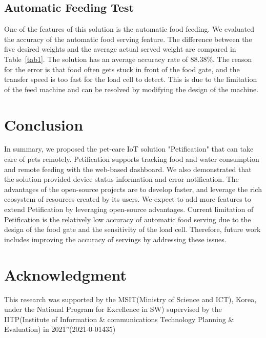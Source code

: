\documentclass[conference]{IEEEtran}
\begin{document}
\subsection{Automatic Feeding Test}
One of the features of this solution is the automatic food feeding. We evaluated the accuracy of the automatic food serving feature.
The difference between the five desired weights and the average actual served weight are compared in Table~\ref{tab1}. 
The solution has an average accuracy rate of 88.38\%.
The reason for the error is that food often gets stuck in front of the food gate, and the transfer speed is too fast for the load cell to detect.
This is due to the limitation of the feed machine and can be resolved by modifying the design of the machine.


\balance 
\section{Conclusion}
In summary, we proposed the pet-care IoT solution "Petification" that can take care of pets remotely. 
Petification supports tracking food and water consumption and remote feeding with the web-based dashboard.  
We also demonstrated that the solution provided device status information and error notification.  
The advantages of the open-source projects are to develop faster, and leverage the rich ecosystem of resources created by its users.
We expect to add more features to extend Petification by leveraging open-source advantages.
Current limitation of Petification is the relatively low accuracy of automatic food serving due to the design of the food gate and the sensitivity of the load cell.
Therefore, future work includes improving the accuracy of servings by addressing these issues.

\section*{Acknowledgment}
This research was supported by the MSIT(Ministry of Science and ICT), Korea, under the National Program for Excellence in SW) supervised by the IITP(Institute of Information \& communications Technology Planning \& Evaluation) in 2021”(2021-0-01435)

\end{document}
